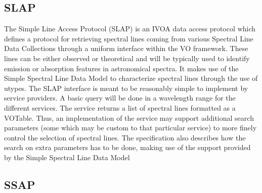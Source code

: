 \documentclass[11pt,a4paper]{ivoa}
\begin{document}
\subsection{SLAP}

The Simple Line Access Protocol (SLAP) \citep{2010ivoa.specQ1209O} is an IVOA data access protocol which defines a protocol 
for retrieving spectral lines coming from various Spectral Line Data Collections through a 
uniform interface within the VO framework. These lines can be either observed or theoretical 
and will be typically used to identify emission or absorption features in astronomical 
spectra. It makes use of the Simple Spectral Line Data Model to characterize spectral lines 
through the use of utypes. The SLAP interface is meant to be reasonably simple to implement 
by service providers. A basic query will be done in a wavelength range for the different 
services. The service returns a list of spectral lines formatted as a VOTable. Thus, an 
implementation of the service may support additional search parameters (some which may be 
custom to that particular service) to more finely control the selection of spectral lines.
The specification also describes how the search on extra parameters has to be done, making 
use of the support provided by the Simple Spectral Line Data Model

\subsection{SSAP}
\end{document}
